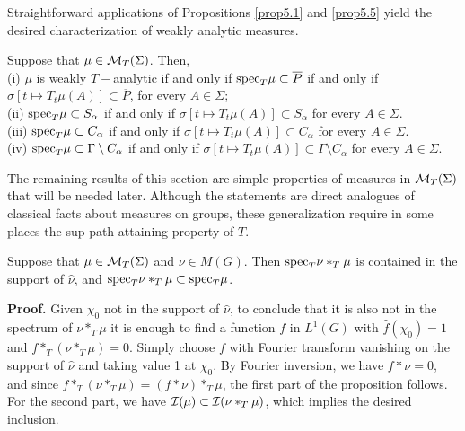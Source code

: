 \documentclass[12pt,leqno]{article}
\def\cI{{\cal I}}
\def\cMT{{\cal M}_T(\Sigma)}
\begin{document}
Straightforward applications of Propositions
\ref{prop5.1} 
and \ref{prop5.5} yield the 
desired characterization of weakly analytic measures.
\begin{cor}
Suppose that $\mu\in \cMT$.  Then,\\
(i)  $\mu$ is weakly $T-$analytic if and only if
${\rm spec}_T\mu\subset \overline{P}$ if and only if
$\sigma [t\mapsto T_t\mu (A)]\subset \overline{P}$, for every
$A\in \Sigma$;  \\ 
(ii) $ {\rm spec}_T\mu\subset S_\alpha $ if and only if 
$\sigma[t\mapsto T_t\mu(A)]\subset S_\alpha$
for every $A\in \Sigma$.  \\
(iii) $ {\rm spec}_T\mu\subset C_\alpha $ if and only if 
$\sigma[t\mapsto T_t\mu(A)]\subset C_\alpha$
for every $A\in \Sigma$.
\\
(iv)  $ {\rm spec}_T\mu\subset \Gamma\setminus C_\alpha $
 if and only if 
$\sigma[t\mapsto T_t\mu(A)]\subset \Gamma\setminus  C_\alpha$
for every $A\in \Sigma$. 
\label{cor5.7}
\end{cor}
The remaining results of this section are 
simple properties of measures in $\cMT$ that will be needed later.  
Although the statements are 
direct analogues of classical facts about measures on groups, these
generalization require in some places the sup path
attaining property of $T$.


\begin{prop}
Suppose that $\mu\in \cMT$ and $\nu\in M(G)$.
Then ${\rm spec}_T \nu*_T\mu$ is contained in the support
of $\widehat{\nu}$, and 
${\rm spec}_T \nu*_T\mu\subset {\rm spec}_T \mu$.
\label{proposition5.8}
\end{prop}
{\bf Proof.}  
Given $\chi_0$ not in the support of $\widehat{\nu}$, to
conclude that it is also not in the spectrum of 
$\nu*_T\mu$ it is enough to find a function $f$
in $L^1(G)$ with $\widehat{f}(\chi_0)=1$ and
$f*_T(\nu*_T\mu)=0$.  Simply choose $f$ with Fourier transform
vanishing on the support of $\widehat{\nu}$ and taking value 1
at $\chi_0$.  By Fourier inversion, we have
$f*\nu=0$, and since
$f*_T(\nu*_T\mu)=(f*\nu)*_T\mu$, the 
first part of the proposition follows.
For the second part,
we have $\cI (\mu)\subset \cI (\nu*_T\mu)$,
which implies the desired inclusion.\\
\end{document}
